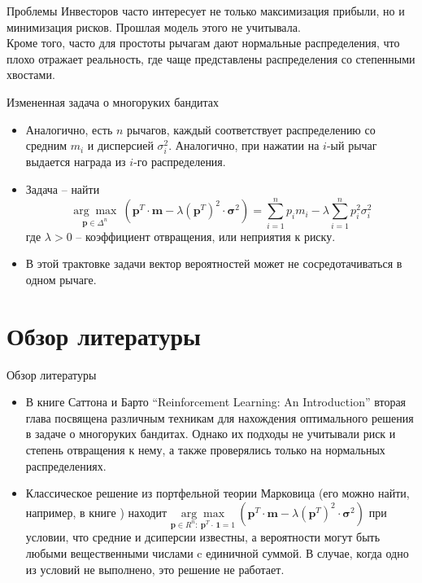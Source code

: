 \documentclass[11pt]{beamer} %
\begin{document}
    \begin{frame}{Проблемы}
        Инвесторов часто интересует не только максимизация прибыли, но и минимизация рисков. Прошлая модель этого не учитывала. \pause \\
        Кроме того, часто для простоты рычагам дают нормальные распределения, что плохо отражает реальность, где чаще представлены распределения со степенными хвостами.
    \end{frame}
    \begin{frame}{Измененная задача о многоруких бандитах}
        \begin{itemize}
            \item<1-> Аналогично, есть $n$ рычагов, каждый соответствует распределению со средним $m_i$ и дисперсией $\sigma_i^2$. Аналогично, при нажатии на $i$-ый рычаг выдается награда из $i$-го распределения.
            \item<2-> Задача -- найти \[\underset{\textbf{p} \in \Delta^n}{\arg \max} \: \left(\textbf{p}^T \cdot \textbf{m} - \lambda \left(\textbf{p}^T\right)^2 \cdot \boldsymbol{\sigma}^2 \right) = \sum_{i=1}^n p_i m_i - \lambda \sum_{i=1}^n p_i^2 \sigma_i^2\]
            где $\lambda > 0$ -- коэффициент отвращения, или неприятия к риску.
            \item<3-> В этой трактовке задачи вектор вероятностей может не сосредотачиваться в одном рычаге.
        \end{itemize}
    \end{frame}

\section{Обзор литературы}
    \begin{frame}{Обзор литературы}
        \begin{itemize}
            \item<1-> В книге Саттона и Барто ``Reinforcement Learning: An Introduction'' \cite{suttonbarto} вторая глава посвящена различным техникам для нахождения оптимального решения в задаче о многоруких бандитах. Однако их подходы не учитывали риск и степень отвращения к нему, а также проверялись только на нормальных распределениях.
            \item<2-> Классическое решение из портфельной теории Марковица (его можно найти, например, в книге \cite{bouchaudpotters}) находит $\underset{\textbf{p} \in R^n: \: \textbf{p}^T \cdot \, \textbf{1} = 1}{\arg \max} \: \left(\textbf{p}^T \cdot \textbf{m} - \lambda \left(\textbf{p}^T\right)^2 \cdot \boldsymbol{\sigma}^2 \right)$ при условии, что средние и дсиперсии известны, а вероятности могут быть любыми вещественными числами c единичной суммой. В случае, когда одно из условий не выполнено, это решение не работает.
        \end{itemize}
    \end{frame}
\end{document}
